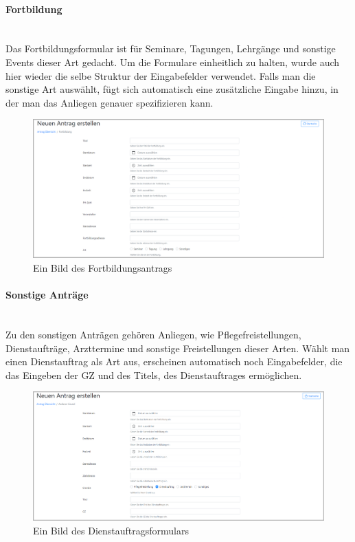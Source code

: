 \paragraph{Fortbildung}
~\\
Das Fortbildungsformular ist für Seminare, Tagungen, Lehrgänge und sonstige Events dieser Art gedacht. Um die Formulare einheitlich zu halten, wurde auch hier wieder die selbe Struktur der Eingabefelder verwendet. Falls man die sonstige Art auswählt, fügt sich automatisch eine zusätzliche Eingabe hinzu, in der man das Anliegen genauer spezifizieren kann.
\begin{figure}[H]
	\centering
	\includegraphics[width=1\linewidth]{images/website/fortbildung_1}
	\caption[Fortbildungsantrag]{Ein Bild des Fortbildungsantrags}
	\label{fig:frotbildung}
\end{figure}

\paragraph{Sonstige Anträge}
~\\
Zu den sonstigen Anträgen gehören Anliegen, wie Pflegefreistellungen, Dienstaufträge, Arzttermine und sonstige Freistellungen dieser Arten. Wählt man einen Dienstauftrag als Art aus, erscheinen automatisch noch Eingabefelder, die das Eingeben der GZ und des Titels, des Dienstauftrages ermöglichen.
\begin{figure}[H]
	\centering
	\includegraphics[width=1\linewidth]{images/website/dienstauftrag}
	\caption[Dienstreiseauftrag]{Ein Bild des Dienstauftragsformulars}
	\label{fig:dienst}
\end{figure}

